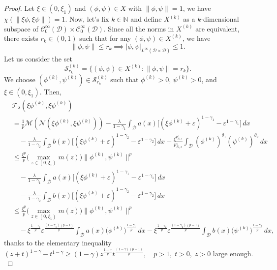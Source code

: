 \documentclass[reqno]{amsart}
\begin{document}
\begin{proof}
Let $\xi\in (0,\xi_1)$ and $(\phi,\psi)\in X$ with $\| \phi,\psi\|=1$, we have 
$\chi(\| \xi\phi,\xi\psi\|)=1$. Now, let's fix $k\in \mathbb{N}$ and define 
$X^{(k)}$ as a $k$-dimensional subspace of 
$\mathcal{C}^\infty_0(\mathcal{D})\times \mathcal{C}^\infty_0(\mathcal{D})$. 
Since all the norms in $X^{(k)}$ are equivalent, there exists $r_k\in (0,1)$ 
such that for any $(\phi,\psi)\in X^{(k)}$, we have
$$
\| \phi,\psi\|\leq r_k \implies |\phi,\psi|_{L^\infty(\mathcal{D}\times\mathcal{D})}
\leq 1.
$$
Let us consider the set
$$
\mathscr{S}_{r_k}^{(k)}=\lbrace (\phi,\psi)\in X^{(k)}: \| \phi,\psi\|=r_k\rbrace.
$$
We choose $(\phi^{(k)},\psi^{(k)})\in \mathscr{S}_{r_k}^{(k)}$ such that 
$\phi^{(k)}> 0$, $\psi^{(k)}> 0$, and $\xi\in (0,\xi_1)$. Then,
\begin{align*}
&\mathcal{T}_{\lambda}(\xi\phi^{(k)},\xi\psi^{(k)}) \\
&=\frac{1}{p}\mathscr{M}(\mathcal{N}(\xi\phi^{(k)},\xi\psi^{(k)}))
 -\frac{\lambda}{1-\gamma_1}\int_\mathcal{D} a(x)
 \Big[(\xi\phi^{(k)}+\varepsilon)^{1-\gamma_1}-\varepsilon^{1-\gamma_1}\Big]\,dx\\
&\quad -\frac{\lambda}{1-\gamma_2}\int_\mathcal{D} b(x)
 \Big[(\xi\psi^{(k)}+\varepsilon)^{1-\gamma_2}-\varepsilon^{1-\gamma_2}\Big]\,dx
 -\frac{\xi^{p^\star_{N,s}}}{p^\star_{N,s}}\int_\mathcal{D} 
  (\phi^{(k)})^{\theta_1}(\psi^{(k)})^{\theta_2}\,dx\\
&\leq\frac{\xi^p}{p}\Big(\max_{z\in(0,\xi_1)}m(z)
 \Big)\| \phi^{(k)},\psi^{(k)}\|^p\\
&\quad -\frac{\lambda}{1-\gamma_1}\int_\mathcal{D} a(x)
 \Big[(\xi\phi^{(k)}+\varepsilon)^{1-\gamma_1}-\varepsilon^{1-\gamma_1}\Big]\,dx\\
&\quad -\frac{\lambda}{1-\gamma_2}\int_\mathcal{D} b(x)
\Big[(\xi\psi^{(k)}+\varepsilon)^{1-\gamma_2}-\varepsilon^{1-\gamma_2}\Big]\,dx\\
&\leq\frac{\xi^p}{p}\Big(\max_{z\in(0,\xi_1)}m(z)
 \Big)\| \phi^{(k)},\psi^{(k)}\|^p\\
&\quad -\xi^\frac{1-\gamma_1}{p}\varepsilon^\frac{(1-\gamma_1)(p-1)}{p}
 \int_\mathcal{D}a(x)\big(\phi^{(k)}\big)^\frac{1-\gamma_1}{p}\,dx
 -\xi^\frac{1-\gamma_2}{p}\varepsilon^\frac{(1-\gamma_2)(p-1)}{p}
 \int_\mathcal{D}b(x)\big(\psi^{(k)}\big)^\frac{1-\gamma_2}{p}\,dx,
\end{align*}
thanks to the elementary inequality
$$
(z+t)^{1-\gamma}-t^{1-\gamma}
\geq (1-\gamma)z^\frac{1-\gamma}{p}t^\frac{(1-\gamma)(p-1)}{p},\quad
 p>1,\; t>0,\; z>0 \text{ large enough}.
$$
\end{proof}
\end{document}
